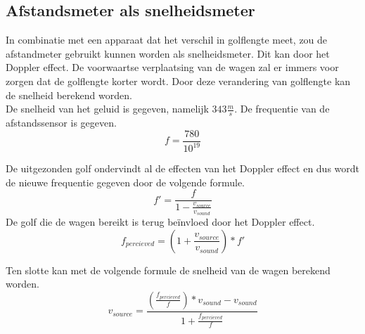  

\subsection{Afstandsmeter als snelheidsmeter}
In combinatie met een apparaat dat het verschil in golflengte meet, zou de afstandmeter gebruikt kunnen worden als snelheidsmeter. Dit kan door het Doppler effect. De voorwaartse verplaatsing van de wagen zal er immers voor zorgen dat de golflengte korter wordt. Door deze verandering van golflengte kan de snelheid berekend worden.\\

De snelheid van het geluid is gegeven, namelijk $343 \frac{m}{s}$. De frequentie van de afstandssensor is gegeven.
$$f=\frac{780}{10^{19}}$$

De uitgezonden golf ondervindt al de effecten van het Doppler effect en dus wordt de nieuwe frequentie gegeven door de volgende formule.
\begin{equation}
f'=\frac{f}{1-\frac{v_{source}}{v_{sound}}}
\end{equation}
De golf die de wagen bereikt is terug be\"invloed door het Doppler effect.
\begin{equation}
f_{percieved}=\left(1+\frac{v_{source}}{v_{sound}}\right)*f'
\end{equation}

Ten slotte kan met de volgende formule de snelheid van de wagen berekend worden.
\begin{equation}
v_{source} = \frac{\left(\frac{f_{percieved}}{f}\right)*v_{sound}-v_{sound}}{1+\frac{f_{percieved}}{f}}
\end{equation}
